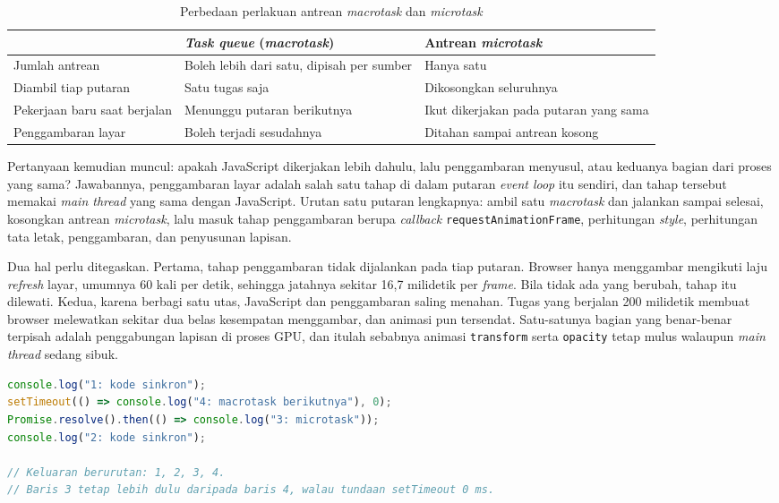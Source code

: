 \begin{table}[!htb]
  \centering
  \caption{Perbedaan perlakuan antrean \textit{macrotask} dan \textit{microtask}}
  \label{tab:antrean}
  \begin{tabularx}{\textwidth}{lXX}
    \hline
     & \textbf{\textit{Task queue} (\textit{macrotask})} & \textbf{Antrean \textit{microtask}} \\
    \hline
    Jumlah antrean & Boleh lebih dari satu, dipisah per sumber & Hanya satu \\
    \hline
    Diambil tiap putaran & Satu tugas saja & Dikosongkan seluruhnya \\
    \hline
    Pekerjaan baru saat berjalan & Menunggu putaran berikutnya & Ikut dikerjakan pada putaran yang sama \\
    \hline
    Penggambaran layar & Boleh terjadi sesudahnya & Ditahan sampai antrean kosong \\
    \hline
  \end{tabularx}
\end{table}

Pertanyaan kemudian muncul: apakah JavaScript dikerjakan lebih dahulu, lalu
penggambaran menyusul, atau keduanya bagian dari proses yang sama? Jawabannya,
penggambaran layar adalah salah satu tahap di dalam putaran \textit{event loop}
itu sendiri, dan tahap tersebut memakai \textit{main thread} yang sama dengan
JavaScript. Urutan satu putaran lengkapnya: ambil satu \textit{macrotask} dan
jalankan sampai selesai, kosongkan antrean \textit{microtask}, lalu masuk tahap
penggambaran berupa \textit{callback} \texttt{requestAnimationFrame},
perhitungan \textit{style}, perhitungan tata letak, penggambaran, dan penyusunan
lapisan.

Dua hal perlu ditegaskan. Pertama, tahap penggambaran tidak dijalankan pada
tiap putaran. Browser hanya menggambar mengikuti laju \textit{refresh} layar, umumnya
60 kali per detik, sehingga jatahnya sekitar 16,7 milidetik per \textit{frame}.
Bila tidak ada yang berubah, tahap itu dilewati. Kedua, karena berbagi satu
utas, JavaScript dan penggambaran saling menahan. Tugas yang berjalan 200
milidetik membuat browser melewatkan sekitar dua belas kesempatan menggambar,
dan animasi pun tersendat. Satu-satunya bagian yang benar-benar terpisah adalah
penggabungan lapisan di proses GPU, dan itulah sebabnya animasi
\texttt{transform} serta \texttt{opacity} tetap mulus walaupun \textit{main
thread} sedang sibuk.

\begin{lstlisting}[language=TypeScript, caption={Urutan eksekusi tugas dan \textit{microtask}, tersedia di \berkas{sources/chapter02/urutan-event-loop.js}}, label={lst:urutan}]
console.log("1: kode sinkron");
setTimeout(() => console.log("4: macrotask berikutnya"), 0);
Promise.resolve().then(() => console.log("3: microtask"));
console.log("2: kode sinkron");

// Keluaran berurutan: 1, 2, 3, 4.
// Baris 3 tetap lebih dulu daripada baris 4, walau tundaan setTimeout 0 ms.
\end{lstlisting}

